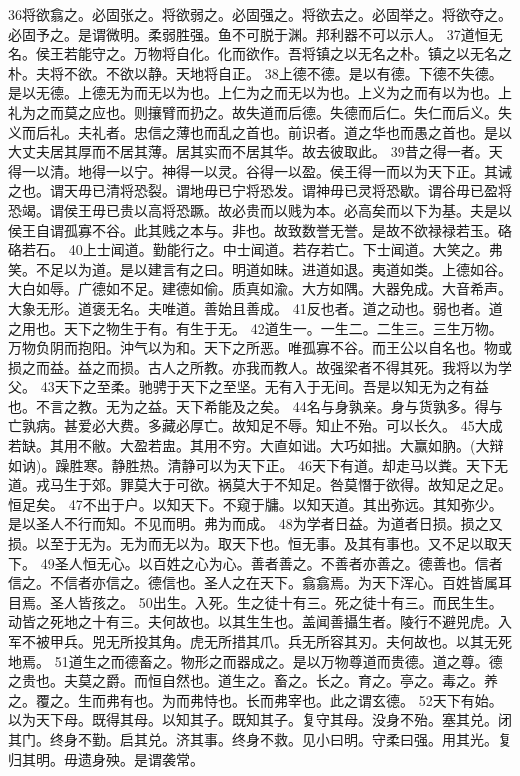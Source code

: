\documentclass[a5paper,zihao=-4,oneside,UTF8]{ctexart}
\begin{document}
36将欲翕之。必固张之。将欲弱之。必固强之。将欲去之。必固举之。将欲夺之。必固予之。是谓微明。柔弱胜强。鱼不可脱于渊。邦利器不可以示人。
37道恒无名。侯王若能守之。万物将自化。化而欲作。吾将镇之以无名之朴。镇之以无名之朴。夫将不欲。不欲以静。天地将自正。
38上德不德。是以有德。下德不失德。是以无德。上德无为而无以为也。上仁为之而无以为也。上义为之而有以为也。上礼为之而莫之应也。则攘臂而扔之。故失道而后德。失德而后仁。失仁而后义。失义而后礼。夫礼者。忠信之薄也而乱之首也。前识者。道之华也而愚之首也。是以大丈夫居其厚而不居其薄。居其实而不居其华。故去彼取此。
39昔之得一者。天得一以清。地得一以宁。神得一以灵。谷得一以盈。侯王得一而以为天下正。其诫之也。谓天毋已清将恐裂。谓地毋已宁将恐发。谓神毋已灵将恐歇。谓谷毋已盈将恐竭。谓侯王毋已贵以高将恐蹶。故必贵而以贱为本。必高矣而以下为基。夫是以侯王自谓孤寡不谷。此其贱之本与。非也。故致数誉无誉。是故不欲禄禄若玉。硌硌若石。
40上士闻道。勤能行之。中士闻道。若存若亡。下士闻道。大笑之。弗笑。不足以为道。是以建言有之曰。明道如昧。进道如退。夷道如类。上德如谷。大白如辱。广德如不足。建德如偷。质真如渝。大方如隅。大器免成。大音希声。大象无形。道褒无名。夫唯道。善始且善成。
41反也者。道之动也。弱也者。道之用也。天下之物生于有。有生于无。
42道生一。一生二。二生三。三生万物。万物负阴而抱阳。沖气以为和。天下之所恶。唯孤寡不谷。而王公以自名也。物或损之而益。益之而损。古人之所教。亦我而教人。故强梁者不得其死。我将以为学父。
43天下之至柔。驰骋于天下之至坚。无有入于无间。吾是以知无为之有益也。不言之教。无为之益。天下希能及之矣。
44名与身孰亲。身与货孰多。得与亡孰病。甚爱必大费。多藏必厚亡。故知足不辱。知止不殆。可以长久。
45大成若缺。其用不敝。大盈若盅。其用不穷。大直如诎。大巧如拙。大赢如肭。(大辩如讷)。躁胜寒。静胜热。清静可以为天下正。
46天下有道。却走马以粪。天下无道。戎马生于郊。罪莫大于可欲。祸莫大于不知足。咎莫憯于欲得。故知足之足。恒足矣。
47不出于户。以知天下。不窥于牗。以知天道。其出弥远。其知弥少。是以圣人不行而知。不见而明。弗为而成。
48为学者日益。为道者日损。损之又损。以至于无为。无为而无以为。取天下也。恒无事。及其有事也。又不足以取天下。
49圣人恒无心。以百姓之心为心。善者善之。不善者亦善之。德善也。信者信之。不信者亦信之。德信也。圣人之在天下。翕翕焉。为天下浑心。百姓皆属耳目焉。圣人皆孩之。
50出生。入死。生之徒十有三。死之徒十有三。而民生生。动皆之死地之十有三。夫何故也。以其生生也。盖闻善攝生者。陵行不避兕虎。入军不被甲兵。兕无所投其角。虎无所措其爪。兵无所容其刃。夫何故也。以其无死地焉。
51道生之而德畜之。物形之而器成之。是以万物尊道而贵德。道之尊。德之贵也。夫莫之爵。而恒自然也。道生之。畜之。长之。育之。亭之。毒之。养之。覆之。生而弗有也。为而弗恃也。长而弗宰也。此之谓玄德。
52天下有始。以为天下母。既得其母。以知其子。既知其子。复守其母。没身不殆。塞其兑。闭其门。终身不勤。启其兑。济其事。终身不救。见小曰明。守柔曰强。用其光。复归其明。毋遗身殃。是谓袭常。
\end{document}
